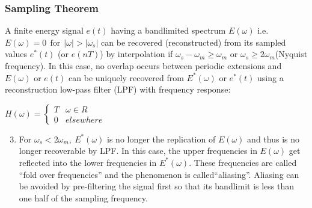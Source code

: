 \documentclass[mathserif, 10pt]{beamer} %
\begin{document}
\frame
{

\normalsize

\frametitle{Sampling Theorem}

A finite energy signal $e(t)$ having a bandlimited spectrum $E(\omega)$ i.e. $E(\omega)=0 ~~\text{for} ~~|\omega|>|\omega_s|$ can be recovered (reconstructed) from its sampled values $e^*(t)$ (or $e(nT)$) by interpolation if  $\omega_s-\omega_m \ge \omega_m$ or $ \omega_s \ge 2\omega_m $(Nyquist frequency). In this case, no overlap occurs between periodic extensions and $E(\omega)$ or $e(t)$ can be uniquely recovered from $E^*(\omega)$ or $e^*(t)$ using a reconstruction low-pass filter (LPF) with frequency response:\\ \vspace{.1in}

$H(\omega) = \left \{
\begin{array}{lc}
	T& \omega \in R\\
	0& elsewhere
\end{array} \right.$


\begin{enumerate}
	\setcounter{enumi}{2}
\item For $\omega_s<2\omega_m,~ E^*(\omega)$ is no longer the replication of $E(\omega)$ and thus is no longer recoverable by LPF.  In this case, the upper frequencies in $E(\omega)$ get reflected into the lower frequencies in $E^*(\omega)$.  These frequencies are called ``fold over frequencies'' and the phenomenon is called``aliasing''.  Aliasing can be avoided by pre-filtering the signal first so that its bandlimit is less than one half of the sampling frequency.

\end{enumerate}


}
\end{document}
